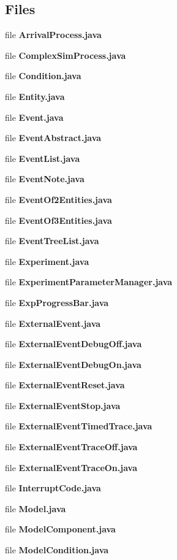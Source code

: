 \subsection*{Files}
\begin{DoxyCompactItemize}
\item 
file {\bfseries Arrival\-Process.\-java}
\item 
file {\bfseries Complex\-Sim\-Process.\-java}
\item 
file {\bfseries Condition.\-java}
\item 
file {\bfseries Entity.\-java}
\item 
file {\bfseries Event.\-java}
\item 
file {\bfseries Event\-Abstract.\-java}
\item 
file {\bfseries Event\-List.\-java}
\item 
file {\bfseries Event\-Note.\-java}
\item 
file {\bfseries Event\-Of2\-Entities.\-java}
\item 
file {\bfseries Event\-Of3\-Entities.\-java}
\item 
file {\bfseries Event\-Tree\-List.\-java}
\item 
file {\bfseries Experiment.\-java}
\item 
file {\bfseries Experiment\-Parameter\-Manager.\-java}
\item 
file {\bfseries Exp\-Progress\-Bar.\-java}
\item 
file {\bfseries External\-Event.\-java}
\item 
file {\bfseries External\-Event\-Debug\-Off.\-java}
\item 
file {\bfseries External\-Event\-Debug\-On.\-java}
\item 
file {\bfseries External\-Event\-Reset.\-java}
\item 
file {\bfseries External\-Event\-Stop.\-java}
\item 
file {\bfseries External\-Event\-Timed\-Trace.\-java}
\item 
file {\bfseries External\-Event\-Trace\-Off.\-java}
\item 
file {\bfseries External\-Event\-Trace\-On.\-java}
\item 
file {\bfseries Interrupt\-Code.\-java}
\item 
file {\bfseries Model.\-java}
\item 
file {\bfseries Model\-Component.\-java}
\item 
file {\bfseries Model\-Condition.\-java}
\item 

\end{DoxyCompactItemize}
